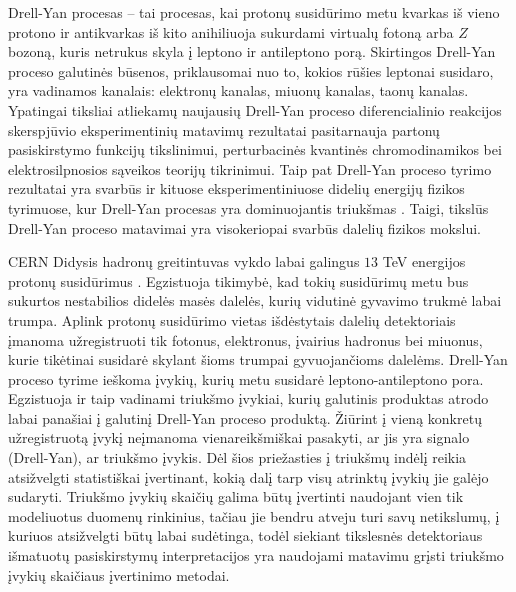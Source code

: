 \documentclass[a4paper, 12pt, oneside]{article}
\begin{document}
Drell-Yan procesas \cite{DYoriginal} -- tai procesas, kai protonų susidūrimo metu kvarkas iš vieno protono ir antikvarkas
iš kito anihiliuoja sukurdami virtualų fotoną arba $Z$ bozoną, kuris netrukus skyla į leptono ir antileptono porą.
Skirtingos Drell-Yan proceso galutinės būsenos, priklausomai nuo to, kokios rūšies leptonai susidaro, yra
vadinamos kanalais: elektronų kanalas, miuonų kanalas, taonų kanalas.
Ypatingai tiksliai atliekamų naujausių Drell-Yan proceso diferencialinio reakcijos skerspjūvio eksperimentinių matavimų
rezultatai \cite{DY2011, DY7TeVatlas, DY2015, DY8TeVatlas, DY2018} pasitarnauja partonų pasiskirstymo funkcijų tikslinimui,
perturbacinės kvantinės chromodinamikos bei elektrosilpnosios sąveikos teorijų tikrinimui.
Taip pat Drell-Yan proceso tyrimo rezultatai yra svarbūs ir kituose eksperimentiniuose didelių energijų fizikos
tyrimuose, kur Drell-Yan procesas yra dominuojantis triukšmas \cite{Higgs2018, Zprime, SUSYtau}.
Taigi, tikslūs Drell-Yan proceso matavimai yra visokeriopai svarbūs dalelių fizikos mokslui.

CERN Didysis hadronų greitintuvas vykdo labai galingus $13$ TeV energijos protonų susidūrimus \cite{DY2018}.
Egzistuoja tikimybė, kad tokių susidūrimų metu bus sukurtos nestabilios didelės masės dalelės,
kurių vidutinė gyvavimo trukmė labai trumpa.
Aplink protonų susidūrimo vietas išdėstytais dalelių detektoriais įmanoma užregistruoti tik fotonus, elektronus, įvairius hadronus
bei miuonus, kurie tikėtinai susidarė skylant šioms trumpai gyvuojančioms dalelėms.
Drell-Yan proceso tyrime ieškoma įvykių, kurių metu susidarė leptono-antileptono pora.
Egzistuoja ir taip vadinami triukšmo įvykiai, kurių galutinis produktas atrodo labai panašiai
į galutinį Drell-Yan proceso produktą.
Žiūrint į vieną konkretų užregistruotą įvykį neįmanoma vienareikšmiškai pasakyti, ar jis yra signalo
(Drell-Yan), ar triukšmo įvykis.
Dėl šios priežasties į triukšmų indėlį reikia atsižvelgti statistiškai įvertinant,
kokią dalį tarp visų atrinktų įvykių jie galėjo sudaryti.
Triukšmo įvykių skaičių galima būtų įvertinti naudojant vien tik modeliuotus duomenų rinkinius, tačiau jie bendru atveju turi
savų netikslumų, į kuriuos atsižvelgti būtų labai sudėtinga, todėl siekiant tikslesnės detektoriaus išmatuotų pasiskirstymų
interpretacijos yra naudojami matavimu grįsti triukšmo įvykių skaičiaus įvertinimo metodai.
\end{document}
